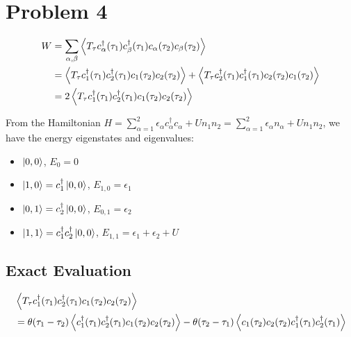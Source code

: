 \documentclass{article}
\begin{document}
\section*{Problem 4}
\begin{equation}
    \begin{split}
        W&=\sum_{\alpha,\beta}\expval{T_\tau c_\alpha^\dagger(\tau_1) c_\beta^\dagger(\tau_1)c_\alpha(\tau_2)c_\beta(\tau_2)}\\
         &=\expval{T_\tau c_1^\dagger(\tau_1) c_2^\dagger(\tau_1)c_1(\tau_2)c_2(\tau_2)}+\expval{T_\tau c_2^\dagger(\tau_1) c_1^\dagger(\tau_1)c_2(\tau_2)c_1(\tau_2)}\\
         &=2\expval{T_\tau c_1^\dagger(\tau_1) c_2^\dagger(\tau_1)c_1(\tau_2)c_2(\tau_2)}
    \end{split}
\end{equation}

From the Hamiltonian $H=\sum_{\alpha=1}^2\epsilon_\alpha c_\alpha^\dagger c_\alpha+U n_1 n_2=\sum_{\alpha=1}^2 \epsilon_\alpha n_\alpha+U n_1 n_2$, we have the energy eigenstates and eigenvalues:
\begin{itemize}
    \item $\ket{0,0}$, $E_0=0$
    \item $\ket{1,0}=c_1^\dagger\ket{0,0}$, $E_{1,0}=\epsilon_1$
    \item $\ket{0,1}=c_2^\dagger\ket{0,0}$, $E_{0,1}=\epsilon_2$
    \item $\ket{1,1}=c_1^\dagger c_2^\dagger\ket{0,0}$, $E_{1,1}=\epsilon_1+\epsilon_2+U$
\end{itemize}
\subsection*{Exact Evaluation}
\begin{equation}
    \begin{split}
        &\expval{T_\tau c_1^\dagger(\tau_1) c_2^\dagger(\tau_1)c_1(\tau_2)c_2(\tau_2)}\\
        &=\theta(\tau_1-\tau_2)\expval{c_1^\dagger(\tau_1) c_2^\dagger(\tau_1)c_1(\tau_2)c_2(\tau_2)}-\theta(\tau_2-\tau_1)\expval{c_1(\tau_2)c_2(\tau_2)c_1^\dagger(\tau_1) c_2^\dagger(\tau_1)}                                                
    \end{split}
\end{equation}
\end{document}
